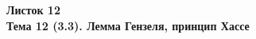 \documentclass[a4paper, 11pt]{article}
\begin{document}
\begin{center} \Large \bf Листок 12\\ Тема 12 (3.3). Лемма Гензеля, принцип Хассе \end{center}


\end{document}
